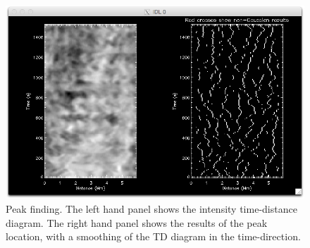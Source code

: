 \documentclass{article}
\begin{document}
\begin{figure}[!tp]
\centering

\includegraphics[scale=0.6, clip=true, viewport=0.5cm 0.cm 25.cm 16.7cm]{slit_smooth.png}  

\caption{Peak finding. The left hand panel shows the intensity time-distance diagram. The right hand panel shows the results of the peak location, with a smoothing of the TD diagram in the time-direction.
}\label{fig:slit_sm}
\end{figure}
\end{document}

